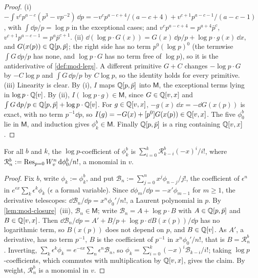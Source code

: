 \begin{proof}
(i) $-\int v^cp^{a-c}(p^3-vp^{-2})\,\dd p=-v^cp^{a-c+4}/(a-c+4)+v^{c+1}p^{a-c-1}/(a-c-1)$, with $\int\dd p/p=\log p$ in the exceptional cases; and $v^cp^{a-c+4}=p^{a+4}\bar p^c$, $v^{c+1}p^{a-c-1}=p^a\bar p^{c+1}$. (ii) $\dd(\log p\cdot G(x))=G(x)\,\dd p/p+\log p\cdot g(x)\,\dd x$, and $G(x(p))\in\mathbb{Q}[p,\bar p]$; the right side has no term $p^0(\log p)^0$ (the termwise $\int G\,\dd p/p$ has none, and $\log p\cdot G$ has no term free of $\log p$), so it is the antiderivative of \cref{def:mod-legs}. A different primitive $G+C$ changes $-\log p\cdot G$ by $-C\log p$ and $\int G\,\dd p/p$ by $C\log p$, so the identity holds for every primitive. (iii) Linearity is clear. By (i), $I$ maps $\mathbb{Q}[p,\bar p]$ into $\mathsf M$, the exceptional terms lying in $\log p\cdot\mathbb{Q}[v]$. By (ii), $I(\log p\cdot g)\in\mathsf M$, since $G\in\mathbb{Q}[v,x]$ and $\int G\,\mathrm{d} p/p\in\mathbb{Q}[p,\bar p]+\log p\cdot\mathbb{Q}[v]$. For $g\in\mathbb{Q}[v,x]$, $-g(x)\,\dd x=-\dd G(x(p))$ is exact, with no term $p^{-1}\dd p$, so $I(g)=-G(x)+[p^0]G(x(p))\in\mathbb{Q}[v,x]$. The five $\phi^b_0$ lie in $\mathsf M$, and induction gives $\phi^b_k\in\mathsf M$. Finally $\mathbb{Q}[p,\bar p]$ is a ring containing $\mathbb{Q}[v,x]$.
\end{proof}

\begin{lem}
\label{lem:mod-genfn}
For all $b$ and $k$, the $\log p$-coefficient of $\phi^b_k$ is $\sum_{i=0}^k\mathcal R^b_{k-i}(-x)^i/i!$, where $\mathcal R^b_n:=\operatorname*{Res}_{p=0}W_{v}^n\,\mathrm{d}\phi^b_0/n!$, a monomial in $v$.
\end{lem}

\begin{proof}
Fix $b$, write $\phi_k:=\phi^b_k$, and put $\mathcal B_n:=\sum_{j=0}^nx^j\phi_{n-j}/j!$, the coefficient of $\epsilon^n$ in $e^{\epsilon x}\sum_k\epsilon^k\phi_k$ ($\epsilon$ a formal variable). Since $\dd\phi_m/\dd p=-x'\phi_{m-1}$ for $m\geq 1$, the derivative telescopes: $\dd\mathcal B_n/\dd p=x^n\phi_0'/n!$, a Laurent polynomial in $p$. By \cref{lem:mod-closure}~(iii), $\mathcal B_n\in\mathsf M$; write $\mathcal B_n=A+\log p\cdot B$ with $A\in\mathbb{Q}[p,\bar p]$ and $B\in\mathbb{Q}[v,x]$. Then $\dd\mathcal B_n/\dd p=A'+B/p+\log p\cdot\dd B(x(p))/\dd p$ has no logarithmic term, so $B(x(p))$ does not depend on $p$, and $B\in\mathbb{Q}[v]$. As $A'$, a derivative, has no term $p^{-1}$, $B$ is the coefficient of $p^{-1}$ in $x^n\phi_0'/n!$, that is $B=\mathcal R^b_n$. Inverting, $\sum_k\epsilon^k\phi_k=e^{-\epsilon x}\sum_n\epsilon^n\mathcal B_n$, so $\phi_k=\sum_{i=0}^k(-x)^i\mathcal B_{k-i}/i!$; taking $\log p$-coefficients, which commutes with multiplication by $\mathbb{Q}[v,x]$, gives the claim. By weight, $\mathcal R^b_n$ is a monomial in $v$.
\end{proof}

